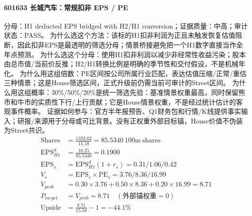 \paragraph{601633 长城汽车：常规扣非 EPS / PE}
分母：H1 deducted EPS bridged with H2/H1 conversion；证据质量：中高；审计状态：PASS。
为什么选这个方法：该标的H1扣非利润为正且未触发恢复估值阻断，因此扣非EPS是最透明的筛选分母；情景桥接避免把一个H1数字直接当作全年点预测。
为什么选这个分母：使用H1扣非利润以减少非经常性收益污染；股本由总市值/当前价反推；H2/H1转换比例是明确的季节性和交付假设，不是机械年化。
为什么用这组倍数：PE区间按公司所属行业匹配，表达估值压缩/正常/重估三种情景；这是House筛选区间，正式升级前仍需当前可审计的Street区间。
为什么用这组概率：30\%/50\%/20\%是统一筛选先验：基准情景权重最高，同时保留熊市和牛市的实质性下行/上行贡献；它是House情景权重，不是经过统计估计的客观事件概率。
证据如何参与：官方半年报预告、Q1财务包和行情/K线提供事实输入；研报/来源用于分母或可比背景。没有正权重外部目标锚，House价值不伪装为Street共识。
\begin{align*}
\mathrm{Shares} &= \frac{1332.62}{15.58}=85.5340\ \mathrm{100m\ shares}\\
\mathrm{EPS}_{H1}^d &= \frac{16.25}{85.5340}=0.1900\\
\mathrm{EPS}_s &= \mathrm{EPS}_{H1}^d(1+r_s)=0.31/1.06/0.42\\
V_s &= \mathrm{EPS}_s\times \mathrm{PE}_s=3.76/8.36/16.99\\
V_{prob} &= 0.30\times 3.76+0.50\times 8.36+0.20\times 16.99=8.71\\
P_{target} &= V_{prob}=8.71\quad(\text{外部锚权重}=0)\\
\mathrm{Upside} &= \frac{8.71}{15.58}-1=-44.1\%\\
\end{align*}

